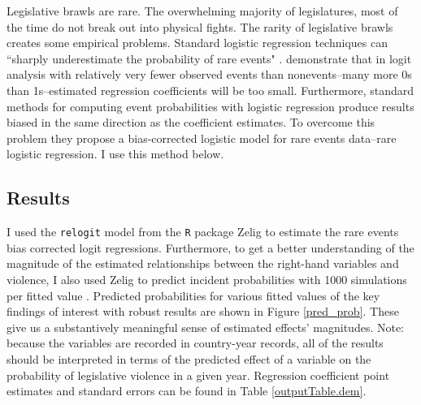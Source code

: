 \documentclass[a4paper]{article}\usepackage{graphicx, color}
\begin{document}
Legislative brawls are rare. The overwhelming majority of legislatures, most of the time do not break out into physical fights. The rarity of legislative brawls creates some empirical problems. Standard logistic regression techniques can ``sharply underestimate the probability of rare events" \cite[137]{KingRareEventsPA2001}. \cite{KingRareEventsPA2001} demonstrate that in logit analysis with relatively very fewer observed events than nonevents--many more 0s than 1s--estimated regression coefficients will be too small. Furthermore, standard methods for computing event probabilities with logistic regression produce results biased in the same direction as the coefficient estimates. To overcome this problem they propose a bias-corrected logistic model for rare events data--rare logistic regression. I use this method below.



\subsection{Results}

I used the {\tt{relogit}} model from the {\tt{R}} package Zelig \citep{IMAIKingZelig2008} to estimate the rare events bias corrected logit regressions. Furthermore, to get a better understanding of the magnitude of the estimated relationships between the right-hand variables and violence, I also used Zelig to predict incident probabilities with 1000 simulations per fitted value \citep[see][]{King2002}. Predicted probabilities for various fitted values of the key findings of interest with robust results are shown in Figure \ref{pred_prob}. These give us a substantively meaningful sense of estimated effects' magnitudes. Note: because the variables are recorded in country-year records, all of the results should be interpreted in terms of the predicted effect of a variable on the probability of legislative violence in a given year. Regression coefficient point estimates and standard errors can be found in Table \ref{outputTable.dem}.
\end{document}
